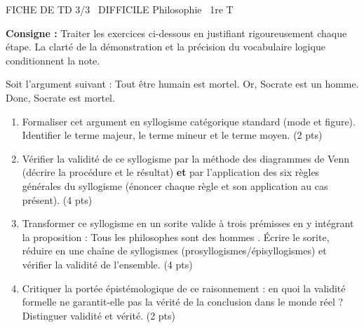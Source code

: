 \documentclass[11pt]{article}
\begin{document}
\pagestyle{empty}

\begin{tcolorbox}[enhanced,colback=popink,colframe=popink,arc=10pt,boxrule=0pt,left=12pt,right=12pt,top=9pt,bottom=9pt]
{\color{white}\popxbold\small FICHE DE TD 3/3 \textbullet\ DIFFICILE \hfill Philosophie \textbullet\ 1re T\par}
\end{tcolorbox}
\vspace{4pt}

\noindent \textbf{Consigne :} Traiter les exercices ci-dessous en justifiant rigoureusement chaque étape. La clarté de la démonstration et la précision du vocabulaire logique conditionnent la note.

\begin{exercice}
Soit l'argument suivant : \og Tout être humain est mortel. Or, Socrate est un homme. Donc, Socrate est mortel. \fg{}
\begin{enumerate}
    \item Formaliser cet argument en syllogisme catégorique standard (mode et figure). Identifier le terme majeur, le terme mineur et le terme moyen. (2 pts)
    \item Vérifier la validité de ce syllogisme par la méthode des diagrammes de Venn (décrire la procédure et le résultat) \textbf{et} par l'application des six règles générales du syllogisme (énoncer chaque règle et son application au cas présent). (4 pts)
    \item Transformer ce syllogisme en un \og sorite \fg{} valide à trois prémisses en y intégrant la proposition : \og Tous les philosophes sont des hommes \fg{}. Écrire le sorite, réduire en une chaîne de syllogismes (prosyllogismes/épisyllogismes) et vérifier la validité de l'ensemble. (4 pts)
    \item Critiquer la portée épistémologique de ce raisonnement : en quoi la validité formelle ne garantit-elle pas la vérité de la conclusion dans le monde réel ? Distinguer validité et vérité. (2 pts)
\end{enumerate}
\end{exercice}
\vspace{8pt}
\end{document}
